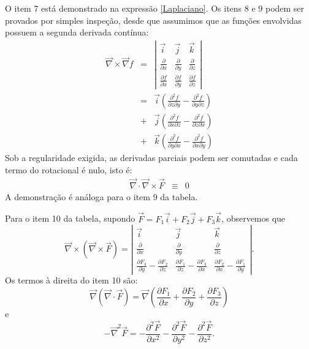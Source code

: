 O item 7 está demonstrado na expressão \ref{Laplaciano}. Os itens 8 e 9 podem ser provados por simples inspeção, desde que assumimos que as funções envolvidas possuem a segunda derivada contínua:
\begin{eqnarray*}
 \vec{\nabla} \times \vec{\nabla} f &=&\left|
 \begin{array}{ccc}
 \vec{i} & \vec{j} & \vec{k} \\
 \frac{\partial}{\partial x} &\frac{\partial}{\partial y} &\frac{\partial}{\partial z} \\
\frac{\partial f}{\partial x} & \frac{\partial f}{\partial y} & \frac{\partial f}{\partial z}
 \end{array}
\right|\\
&=&\vec{i}\left(\frac{\partial^2 f }{\partial z\partial y} - \frac{\partial^2 f}{\partial y\partial z}\right)\\
&+& \vec{j}\left(\frac{\partial^2 f}{\partial  x\partial z}-\frac{\partial^2f}{\partial z\partial x}\right)\\
 &+& \vec{k}\left(\frac{\partial^2 f}{\partial y\partial x}-\frac{\partial^2 f}{\partial x\partial y}\right)
\end{eqnarray*}
Sob a regularidade exigida, as derivadas parciais podem ser comutadas e cada termo do rotacional é nulo, isto é:
\begin{eqnarray}
 \vec{\nabla} \cdot \vec{\nabla}\times\vec{F} &\equiv &0
\end{eqnarray}
A demonstração é análoga para o item 9 da tabela.

Para o item 10 da tabela, supondo $\vec{F}=F_1\vec{i}+F_2\vec{j}+F_3\vec{k}$, observemos que
\begin{equation}
\label{rot_do_rot} 
 \vec{\nabla}\times(\vec{\nabla}\times \vec{F})=\left|
 \begin{array}{ccc}
 \vec{i} & \vec{j} & \vec{k} \\
 \frac{\partial}{\partial x} &\frac{\partial}{\partial y} &\frac{\partial}{\partial z} \\
\frac{\partial F_3}{\partial y}-\frac{\partial F_2}{\partial z} & \frac{\partial F_1}{\partial z}-\frac{\partial F_3}{\partial x} & \frac{\partial F_2}{\partial x}-\frac{\partial F_1}{\partial y}
 \end{array}
\right|.
\end{equation}
Os termos à direita do item 10 são:
\begin{equation}
\label{grad_div} \vec{\nabla}(\vec{\nabla}\cdot \vec{F})=\vec{\nabla}\left(\frac{\partial F_1}{\partial x}+\frac{\partial F_2}{\partial y}+\frac{\partial F_3}{\partial z}\right)
\end{equation}
e
\begin{equation}
\label{menos_Laplaciano} -\vec{\nabla}^2 \vec{F}= -\frac{\partial^2 \vec{F}}{\partial x^2}-\frac{\partial^2 \vec{F}}{\partial y^2}
-\frac{\partial^2 \vec{F}}{\partial z^2}.
\end{equation}

